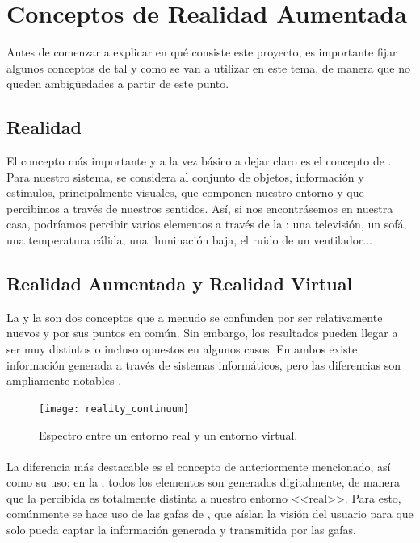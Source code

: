 \documentclass{subfiles}
\begin{document}
        \section{Conceptos de Realidad Aumentada}
        \label{sec:1.4}

        Antes de comenzar a explicar en qué consiste este proyecto, es importante fijar algunos conceptos de \ra tal y como se van a utilizar en este tema, de manera que no queden ambigüedades a partir de este punto.

        \subsection{Realidad}
        \label{sec:1.4.1}
        El concepto más importante y a la vez básico a dejar claro es el concepto de \realidad. Para nuestro sistema, se considera \realidad al conjunto de objetos, información y estímulos, principalmente visuales, que componen nuestro entorno y que percibimos a través de nuestros sentidos. Así, si nos encontrásemos en nuestra casa, podríamos percibir varios elementos a través de la \realidad: una televisión, un sofá, una temperatura cálida, una iluminación baja, el ruido de un ventilador...

        \subsection[Realidad Aumentada y Realidad Virtual]{Realidad Aumentada y Realidad Virtual}
        \label{sec:1.4.2}

        La \ra y la \rv son dos conceptos que a menudo se confunden por ser relativamente nuevos y por sus puntos en común. Sin embargo, los resultados pueden llegar a ser muy distintos o incluso opuestos en algunos casos. En ambos existe información generada a través de sistemas informáticos, pero las diferencias son ampliamente notables \cite{web:diferencias_ra_rv}.

        \begin{figure}[H]
        \centering
        \texttt{[image: reality\_continuum]}
        \caption{Espectro entre un entorno real y un entorno virtual.}
        \label{fig:reality_continuum}
        \end{figure}

        \paragraph{}
        La diferencia más destacable es el concepto de \realidad anteriormente mencionado, así como su uso: en la \rv, todos los elementos son generados digitalmente, de manera que la \realidad percibida es totalmente distinta a nuestro entorno <<real>>. Para esto, comúnmente se hace uso de las gafas de \rv, que aíslan la visión del usuario para que solo pueda captar la información generada y transmitida por las gafas.
    
\end{document}
